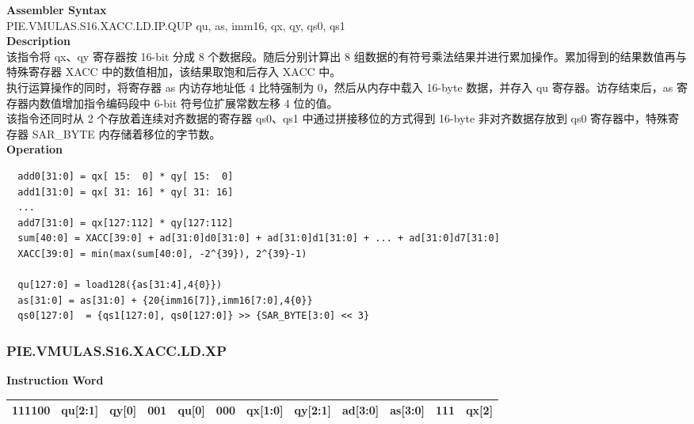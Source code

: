 \textbf{Assembler Syntax} \\
PIE.VMULAS.S16.XACC.LD.IP.QUP qu, as, imm16, qx, qy, qs0, qs1 \\
\textbf{Description} \\
该指令将 qx、qy 寄存器按 16-bit 分成 8 个数据段。随后分别计算出 8 组数据的有符号乘法结果并进行累加操作。累加得到的结果数值再与特殊寄存器 XACC 中的数值相加，该结果取饱和后存入 XACC 中。\\
执行运算操作的同时，将寄存器 as 内访存地址低 4 比特强制为 0，然后从内存中载入 16-byte 数据，并存入 qu 寄存器。访存结束后，as 寄存器内数值增加指令编码段中 6-bit 符号位扩展常数左移 4 位的值。\\
该指令还同时从 2 个存放着连续对齐数据的寄存器 qs0、qs1 中通过拼接移位的方式得到 16-byte 非对齐数据存放到 qs0 寄存器中，特殊寄存器 SAR\_BYTE 内存储着移位的字节数。\\
\textbf{Operation}
\begin{lstlisting}
  add0[31:0] = qx[ 15:  0] * qy[ 15:  0]
  add1[31:0] = qx[ 31: 16] * qy[ 31: 16]
  ...
  add7[31:0] = qx[127:112] * qy[127:112]
  sum[40:0] = XACC[39:0] + ad[31:0]d0[31:0] + ad[31:0]d1[31:0] + ... + ad[31:0]d7[31:0]
  XACC[39:0] = min(max(sum[40:0], -2^{39}), 2^{39}-1)

  qu[127:0] = load128({as[31:4],4{0}})
  as[31:0] = as[31:0] + {20{imm16[7]},imm16[7:0],4{0}}
  qs0[127:0]  = {qs1[127:0], qs0[127:0]} >> {SAR_BYTE[3:0] << 3}
\end{lstlisting}

\newpage
\subsubsection{PIE.VMULAS.S16.XACC.LD.XP}\label{instruction:PIEVMULASS16XACCLDXP}
\setlength\tabcolsep{6pt}
\textbf{Instruction Word} \\
\begin{tabular}{|c|c|c|c|c|c|c|c|c|c|c|c|}
	\hline
	111100 & qu[2:1] & qy[0] & 001 & qu[0] & 000 & qx[1:0] & qy[2:1] & ad[3:0] & as[3:0] & 111 & qx[2] \\
	\hline
\end{tabular}

